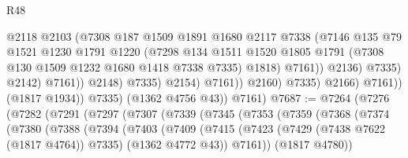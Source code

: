 \begin{lexlean}{R48}
\begin{coremodule}
                                          @2118
                                          @2103
                                          (@7308
                                            @187
                                            @1509
                                            @1891
                                            @1680
                                            @2117
                                            @7338
                                            (@7146
                                              @135
                                              @79
                                              @1521
                                              @1230
                                              @1791
                                              @1220
                                              (@7298
                                                @134
                                                @1511
                                                @1520
                                                @1805
                                                @1791
                                                (@7308 @130 @1509 @1232 @1680 @1418 @7338 @7335)
                                                @1818)
                                              @7161))
                                          @2136)
                                        @7335)
                                      @2142)
                                    @7161))
                                @2148)
                              @7335)
                            @2154)
                          @7161))
                      @2160)
                    @7335)
                  @2166)
                @7161))
            (@1817 @1934))
          @7335)
        (@1362 @4756 @43))
      @7161)
@7687 := @7264
    (@7276
      (@7282
        (@7291
          (@7297
            (@7307
              (@7339
                (@7345
                  (@7353
                    (@7359
                      (@7368
                        (@7374
                          (@7380
                            (@7388
                              (@7394
                                (@7403
                                  (@7409
                                    (@7415
                                      (@7423
                                        (@7429 (@7438 @7622 (@1817 @4764)) @7335)
                                        (@1362 @4772 @43))
                                      @7161))
                                  (@1817 @4780))

\end{coremodule}
\end{lexlean}
